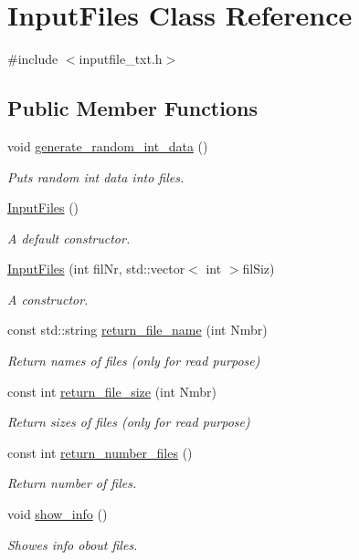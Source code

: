 \hypertarget{class_input_files}{}\section{Input\+Files Class Reference}
\label{class_input_files}


{\ttfamily \#include $<$inputfile\+\_\+txt.\+h$>$}

\subsection*{Public Member Functions}
\begin{DoxyCompactItemize}
\item 
void \hyperlink{class_input_files_a9ef073539a9435208e6619e96b64445a}{generate\+\_\+random\+\_\+int\+\_\+data} ()
\begin{DoxyCompactList}\small\item\em Puts random int data into files. \end{DoxyCompactList}\item 
\hyperlink{class_input_files_a85a092f7ad25a9f959f1a93e5afb2045}{Input\+Files} ()
\begin{DoxyCompactList}\small\item\em A default constructor. \end{DoxyCompactList}\item 
\hyperlink{class_input_files_a500e1a86787be57b9525836c6c912311}{Input\+Files} (int fil\+Nr, std\+::vector$<$ int $>$fil\+Siz)
\begin{DoxyCompactList}\small\item\em A constructor. \end{DoxyCompactList}\item 
const std\+::string \hyperlink{class_input_files_a9246bc217efcfa1569478bcf44e1cd20}{return\+\_\+file\+\_\+name} (int Nmbr)
\begin{DoxyCompactList}\small\item\em Return names of files (only for read purpose) \end{DoxyCompactList}\item 
const int \hyperlink{class_input_files_a9c65bfcc0e684642c40c999959d6d014}{return\+\_\+file\+\_\+size} (int Nmbr)
\begin{DoxyCompactList}\small\item\em Return sizes of files (only for read purpose) \end{DoxyCompactList}\item 
const int \hyperlink{class_input_files_a3db5accd81913e0b89fdd3b4650c8923}{return\+\_\+number\+\_\+files} ()
\begin{DoxyCompactList}\small\item\em Return number of files. \end{DoxyCompactList}\item 
void \hyperlink{class_input_files_ad4d447795b387fa94c1db7a14a965113}{show\+\_\+info} ()
\begin{DoxyCompactList}\small\item\em Showes info obout files. \end{DoxyCompactList}\end{DoxyCompactItemize}
